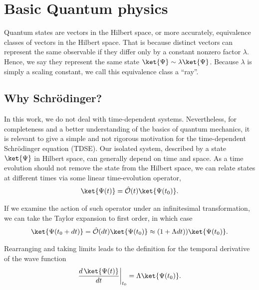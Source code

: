 \section{Basic Quantum physics}\label{sec:basic_quantum_physics}
Quantum states are vectors in the Hilbert space, or more accurately, equivalence classes of vectors in the Hilbert space. That is because distinct vectors can represent the same observable if they differ only by a constant nonzero factor $\lambda$. Hence, we say they represent the same state $\ket{\Psi} \sim \lambda \ket{\Psi}$. Because $\lambda$ is simply a scaling constant, we call this equivalence class a ``ray''.

\subsection{Why Schrödinger?}\label{sec:why_schro}

In this work, we do not deal with time-dependent systems. Nevertheless, for completeness and a better understanding of the basics of quantum mechanics, it is relevant to give a simple and not rigorous motivation for the time-dependent Schrödinger equation (TDSE). Our isolated system, described by a state $\ket{\Psi}$ in Hilbert space, can generally depend on time and space. As a time evolution should not remove the state from the Hilbert space, we can relate states at different times via some linear time-evolution operator,
\begin{align}
    \ket{\Psi(t)} = \op{O}(t)\ket{\Psi(t_0)}.
    \label{eq:time-evol}
\end{align}

If we examine the action of such operator under an infinitesimal transformation, we can take the Taylor expansion to first order, in which case 
\begin{align*}
    \ket{\Psi(t_0 + dt)} = \op{O}(dt)\ket{\Psi(t_0)} \approx (1 + \Lambda dt))\ket{\Psi(t_0)}.
\end{align*}

Rearranging and taking limits leads to the definition for the temporal derivative of the wave function
\begin{align*}
    \frac{d\, \ket{\Psi(t)}}{dt}\biggr\rvert_{t_0} = \Lambda \ket{\Psi(t_0)}.
\end{align*}

